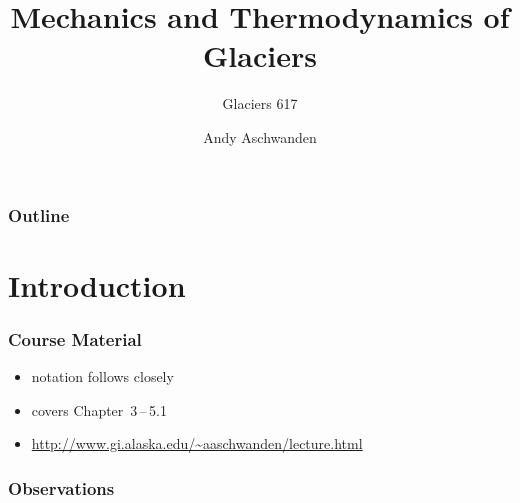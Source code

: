 \documentclass[hide notes,intlimits]{beamer}
\title[Glacier Dynamics] %
{Mechanics and Thermodynamics of Glaciers}
\subtitle{Glaciers 617}
\author[Aschwanden] %
{Andy Aschwanden}
\institute[ARSC] %
{
  Arctic Region Supercomputing Center\\
  University of Alaska Fairbanks, USA
}
\begin{document}
\begin{frame}
  \titlepage
\end{frame}

\begin{frame}
 \frametitle{Outline}
 \tableofcontents[subsectionstyle=hide]
\end{frame}

\section{Introduction}




\begin{frame}
  \frametitle{Course Material}
  \begin{itemize}
    \item notation follows closely \cite{GreveBlatter_disg}
    \item covers Chapter~3\,--\,5.1
    \item \url{http://www.gi.alaska.edu/~aaschwanden/lecture.html}
  \end{itemize}
  \def\newblock{}
  
\end{frame}


\begin{frame}
  \frametitle{Observations}
\end{frame}
\end{document}
